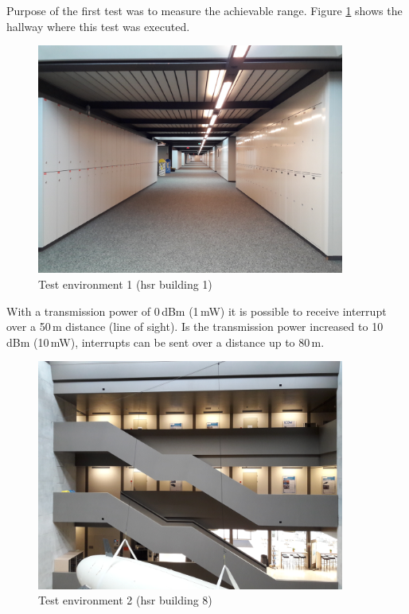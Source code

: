 Purpose of the first test was to measure the achievable range.
Figure \ref{development:env1} shows the hallway where this test was executed.
\begin{figure}[ht]
	\centering
	\includegraphics[width=0.9\textwidth]{4-development/hardware/graphics/env1.jpg}
	\caption{Test environment 1 (\acs{hsr} building 1)\label{development:env1}}
\end{figure}
With a transmission power of 0\,dBm (1\,mW) it is possible to receive interrupt over a 50\,m distance (line of sight).
Is the transmission power increased to 10\,dBm (10\,mW), interrupts can be sent over a distance up to 80\,m.



\begin{figure}[ht]
	\centering
	\includegraphics[width=0.9\textwidth]{4-development/hardware/graphics/env2.jpg}
	\caption{Test environment 2 (\acs{hsr} building 8)\label{development:env2}}
\end{figure}


